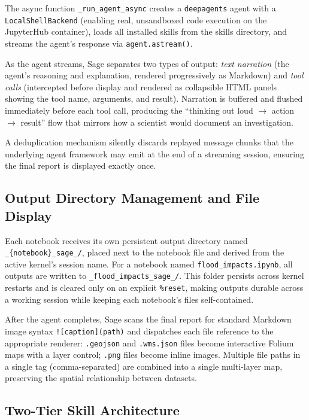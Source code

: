 \documentclass[10pt,twocolumn]{article}
\begin{document}
The async function \texttt{\_run\_agent\_async} creates a \texttt{deepagents} agent with a \texttt{LocalShellBackend} (enabling real, unsandboxed code execution on the JupyterHub container), loads all installed skills from the skills directory, and streams the agent's response via \texttt{agent.astream()}.

As the agent streams, Sage separates two types of output: \emph{text narration} (the agent's reasoning and explanation, rendered progressively as Markdown) and \emph{tool calls} (intercepted before display and rendered as collapsible HTML panels showing the tool name, arguments, and result). Narration is buffered and flushed immediately before each tool call, producing the ``thinking out loud $\rightarrow$ action $\rightarrow$ result'' flow that mirrors how a scientist would document an investigation.

A deduplication mechanism silently discards replayed message chunks that the underlying agent framework may emit at the end of a streaming session, ensuring the final report is displayed exactly once.

\subsection{Output Directory Management and File Display}

Each notebook receives its own persistent output directory named \texttt{\_\{notebook\}\_sage\_/}, placed next to the notebook file and derived from the active kernel's session name. For a notebook named \texttt{flood\_impacts.ipynb}, all outputs are written to \texttt{\_flood\_impacts\_sage\_/}. This folder persists across kernel restarts and is cleared only on an explicit \texttt{\%reset}, making outputs durable across a working session while keeping each notebook's files self-contained.

After the agent completes, Sage scans the final report for standard Markdown image syntax \texttt{![caption](path)} and dispatches each file reference to the appropriate renderer: \texttt{.geojson} and \texttt{.wms.json} files become interactive Folium maps with a layer control; \texttt{.png} files become inline images. Multiple file paths in a single tag (comma-separated) are combined into a single multi-layer map, preserving the spatial relationship between datasets.

\subsection{Two-Tier Skill Architecture}
\end{document}
